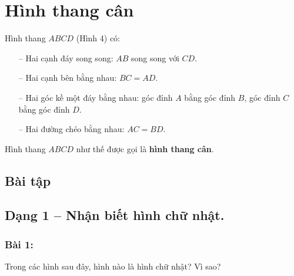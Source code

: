\documentclass[11pt]{article}
\begin{document}
\section{Hình thang cân}
\begin{paracol}{2}
Hình thang \(ABCD\) (Hình 4) có:
\begin{itemize}
  \item[--] Hai cạnh đáy song song: \(AB\) song song với \(CD\).
  \item[--] Hai cạnh bên bằng nhau: \(BC = AD\).
  \item[--] Hai góc kề một đáy bằng nhau: góc đỉnh \(A\) bằng góc đỉnh \(B\), góc đỉnh \(C\) bằng góc đỉnh \(D\).
  \item[--] Hai đường chéo bằng nhau: \(AC = BD\).
\end{itemize}
Hình thang \(ABCD\) như thế được gọi là \textbf{hình thang cân}.
\switchcolumn
\begin{center}
\end{center}
\end{paracol}

\newpage

\begin{center}
\section*{Bài tập}
\end{center}

\subsection*{Dạng 1 – Nhận biết hình chữ nhật.}

\subsubsection*{Bài 1:} Trong các hình sau đây, hình nào là hình chữ nhật? Vì sao?
\end{document}
